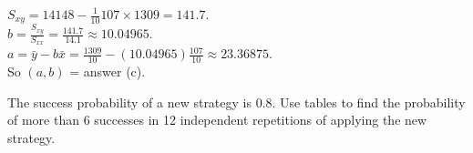 \documentclass[bigtut]{tutorial}
\begin{document}
\begin{tutorial}
\begin{questions}
  \begin{solution}
  $S_{xy} = 14148 -\frac{1}{10} 107 \times 1309 = 141.7$. \\
$b = \frac{ S_{xy} }{ S_{xx} } = \frac{ 141.7}{14.1} \approx 10.04965$. \\
$a = \bar{y} - b \bar{x} = \frac{1309}{10} - (10.04965)\frac{107}{10} \approx 23.36875$. \\
So $(a,b)$ = answer (c).
\end{solution}


\vspace{1cm}
\hspace{-1cm}

\question
The success probability of a new strategy is 0.8. Use tables to find the probability of more than 6 successes in 12 independent repetitions of applying the new strategy.

\end{questions}
\end{tutorial}
\end{document}
